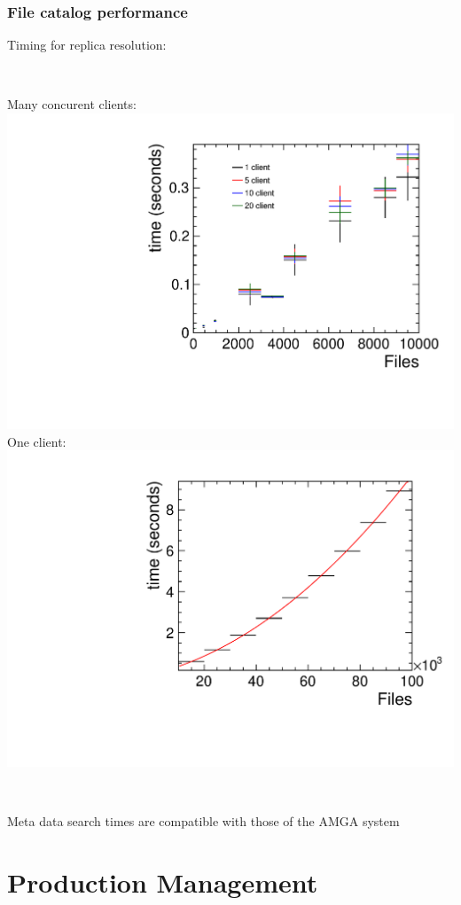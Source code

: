 \documentclass[10pt,table,dvipsnames]{beamer}
\begin{document}
\begin{frame}
  \frametitle{File catalog performance}
Timing for replica resolution:\\
~\\
\begin{columns}[c]
\column{6cm}
Many concurent clients:\\
\includegraphics[width=\textwidth]{DFC_stats_lin_all}
\column{6cm}
One client:\\
\includegraphics[width=\textwidth]{t_vs_f_nc1_zoom2_pol2}
\end{columns}
~\\
Meta data search times are compatible with those of the AMGA system
\end{frame}

\section{Production Management}
\label{sec:ts}
\end{document}
